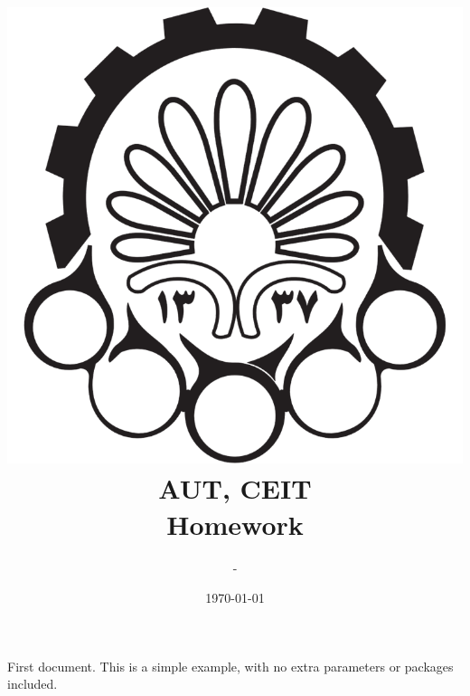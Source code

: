 \documentclass[10pt, a4paper]{article}
\title{
	\includegraphics{aut-logo.png}\\
	AUT, CEIT \course \\
	\numofhw Homework
}
\author{\writer - \stdnum}
\date{\today}
\begin{document}
\maketitle

First document. This is a simple example, with no 
extra parameters or packages included.
\end{document}

